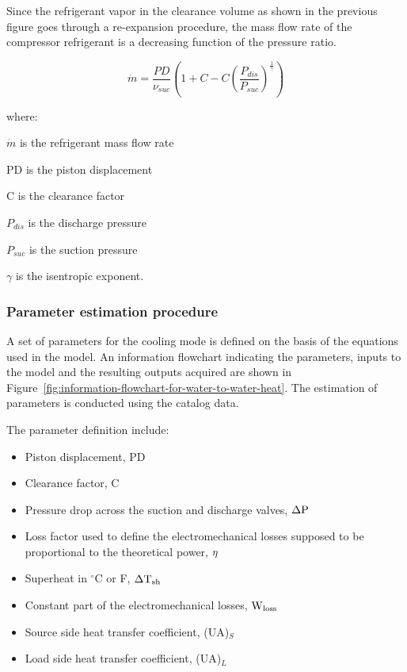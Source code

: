 Since the refrigerant vapor in the clearance volume as shown in the previous figure goes through a re-expansion procedure, the mass flow rate of the compressor refrigerant is a decreasing function of the pressure ratio.

\begin{equation}
{\dot{m}} = \frac{{PD}}{{\nu {}_{suc}}}\left( 1 + C - C{(\frac{{P{}_{dis}}}{{P{}_{suc}}})^{\frac{1}{\gamma }}} \right)
\end{equation}

where:

\({\dot{m}}\) is the refrigerant mass flow rate

PD is the piston displacement

C is the clearance factor

\(P_{dis}\) is the discharge pressure

\(P_{suc}\) is the suction pressure

\(\gamma\) is the isentropic exponent.

\subsubsection{Parameter estimation procedure}\label{parameter-estimation-procedure}

A set of parameters for the cooling mode is defined on the basis of the equations used in the model. An information flowchart indicating the parameters, inputs to the model and the resulting outputs acquired are shown in Figure~\ref{fig:information-flowchart-for-water-to-water-heat}. The estimation of parameters is conducted using the catalog data.

The parameter definition include:

\begin{itemize}
\item Piston displacement, PD
\item Clearance factor, C
\item Pressure drop across the suction and discharge valves, \({\rm{\Delta P}}\)
\item Loss factor used to define the electromechanical losses supposed to be proportional to the theoretical power, \({\rm{\eta }}\)
\item Superheat in \(^{\circ}\)C or F, \({\rm{\Delta T}}{}_{{\rm{sh}}}\)
\item Constant part of the electromechanical losses, \({\rm{W}}{}_{{\rm{loss}}}\)
\item Source side heat transfer coefficient, (UA)\(_{S}\)
\item Load side heat transfer coefficient, (UA)\(_{L}\)
\end{itemize}

